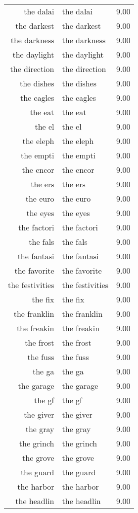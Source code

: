 \begin{table}[ht]
\begin{tabular}{rlr}
  the dalai & the dalai & 9.00 \\ 
  the darkest & the darkest & 9.00 \\ 
  the darkness & the darkness & 9.00 \\ 
  the daylight & the daylight & 9.00 \\ 
  the direction & the direction & 9.00 \\ 
  the dishes & the dishes & 9.00 \\ 
  the eagles & the eagles & 9.00 \\ 
  the eat & the eat & 9.00 \\ 
  the el & the el & 9.00 \\ 
  the eleph & the eleph & 9.00 \\ 
  the empti & the empti & 9.00 \\ 
  the encor & the encor & 9.00 \\ 
  the ers & the ers & 9.00 \\ 
  the euro & the euro & 9.00 \\ 
  the eyes & the eyes & 9.00 \\ 
  the factori & the factori & 9.00 \\ 
  the fals & the fals & 9.00 \\ 
  the fantasi & the fantasi & 9.00 \\ 
  the favorite & the favorite & 9.00 \\ 
  the festivities & the festivities & 9.00 \\ 
  the fix & the fix & 9.00 \\ 
  the franklin & the franklin & 9.00 \\ 
  the freakin & the freakin & 9.00 \\ 
  the frost & the frost & 9.00 \\ 
  the fuss & the fuss & 9.00 \\ 
  the ga & the ga & 9.00 \\ 
  the garage & the garage & 9.00 \\ 
  the gf & the gf & 9.00 \\ 
  the giver & the giver & 9.00 \\ 
  the gray & the gray & 9.00 \\ 
  the grinch & the grinch & 9.00 \\ 
  the grove & the grove & 9.00 \\ 
  the guard & the guard & 9.00 \\ 
  the harbor & the harbor & 9.00 \\ 
  the headlin & the headlin & 9.00 \\ 

\end{tabular}
\end{table}
